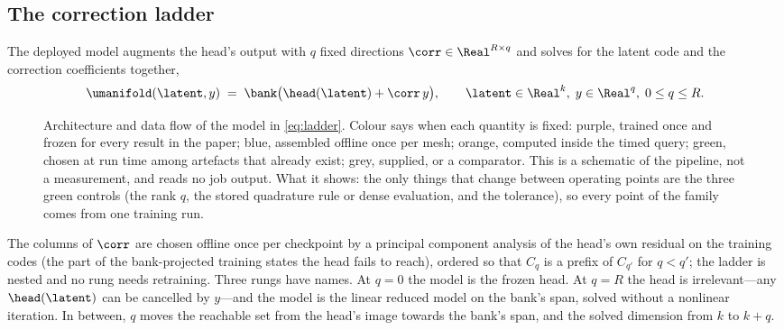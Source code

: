 \subsection{The correction ladder}
\label{sec:method:ladder}

The deployed model augments the head's output with $q$ fixed directions
$\corr\in\Real^{R\times q}$ and solves for the latent code and the correction
coefficients together,
\begin{equation}
  \umanifold(\latent,y) \;=\; \bank\big(\head(\latent) + \corr\,y\big),
  \qquad \latent\in\Real^{k},\; y\in\Real^{q},\; 0\le q\le R .
  \label{eq:ladder}
\end{equation}
\begin{figure}[t]
\centering
\resizebox{0.8\linewidth}{!}{}
\caption{Architecture and data flow of the model in \eqref{eq:ladder}. Colour
says when each quantity is fixed: purple, trained once and frozen for every
result in the paper; blue, assembled offline once per mesh; orange, computed
inside the timed query; green, chosen at run time among artefacts that already
exist; grey, supplied, or a comparator. This is a schematic of the pipeline,
not a measurement, and reads no job output. What it shows: the only things
that change between operating points are the three green controls (the rank
$q$, the stored quadrature rule or dense evaluation, and the tolerance), so
every point of the family comes from one training run.}
\label{fig:arch}
\end{figure}
The columns of $\corr$ are chosen offline once per checkpoint by a principal
component analysis of the head's own residual on the training codes (the part of
the bank-projected training states the head fails to reach), ordered so that
$C_{q}$ is a prefix of $C_{q'}$ for $q<q'$; the ladder is nested and no rung
needs retraining. Three rungs have names. At $q=0$ the model is the frozen
head. At $q=R$ the head is irrelevant---any $\head(\latent)$ can be cancelled
by $y$---and the model is the linear reduced model on the bank's span, solved
without a nonlinear iteration. In between, $q$ moves the reachable set from the
head's image towards the bank's span, and the solved dimension from $k$ to
$k+q$.

